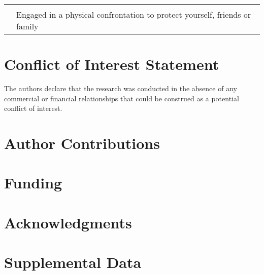 \documentclass[utf8]{article}
\begin{document}
\begin{table}[]
{\begin{tabular}{ll}
                                                                                                                                                                                                                                                 &                                                                                                                                                                                                       \\
                                                                                                                                                                                                                                                 & Engaged in a physical confrontation to protect yourself, friends or family                                                                                                                           
\end{tabular}%
}
\end{table}

\section*{Conflict of Interest Statement}
The authors declare that the research was conducted in the absence of any commercial or financial relationships that could be construed as a potential conflict of interest.

\section*{Author Contributions}


\section*{Funding}

\section*{Acknowledgments}

\section*{Supplemental Data}
\end{document}
